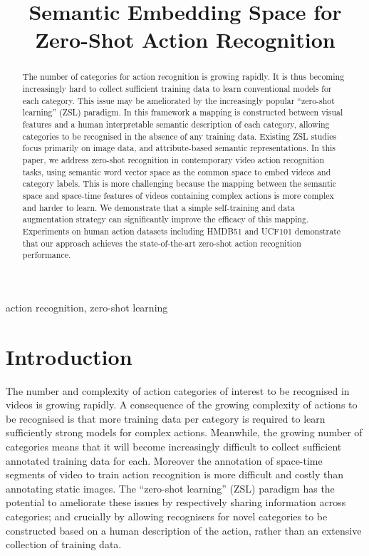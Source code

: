\documentclass{article}
\title{Semantic Embedding Space for Zero-Shot Action Recognition}
\begin{document}
\maketitle
\begin{abstract}
The number of categories for action recognition is growing rapidly. It is thus becoming increasingly hard to collect sufficient training data to learn conventional models for each category. This issue may be ameliorated by the increasingly popular ``zero-shot learning'' (ZSL) paradigm. In this framework a mapping is constructed between visual features and a human interpretable semantic description of each category, allowing categories to be recognised in the absence of any training data. Existing ZSL studies focus primarily on image data, and attribute-based semantic representations. In this paper, we address zero-shot recognition in contemporary video action recognition tasks, using semantic word vector space as the common space to embed videos and category labels. This is more challenging because the mapping between the semantic space and space-time features of videos containing complex actions is more complex and harder to learn. We demonstrate that a simple self-training and data augmentation strategy can significantly improve the efficacy of this mapping. Experiments on human action datasets including HMDB51 and UCF101 demonstrate that our approach achieves the state-of-the-art zero-shot action recognition performance.
\end{abstract}
\begin{keywords}
action recognition, zero-shot learning
\end{keywords}

\vspace{-0.1cm}
\section{Introduction}
\label{sec:intro}

The number and complexity of action categories of interest to be recognised in videos is growing rapidly. A consequence of the growing complexity of actions to be recognised is that more training data per category is required to learn sufficiently strong models for complex actions. Meanwhile, the growing number of categories means that it will become increasingly difficult to collect sufficient annotated training data for each. Moreover the annotation of space-time segments of video to train action recognition is more difficult and costly than annotating static images. The ``zero-shot learning'' (ZSL) paradigm has the potential to ameliorate these issues by respectively sharing information across categories; and crucially by allowing recognisers for novel categories to be constructed based on a human description of the action, rather than an extensive collection of training data.
\end{document}
